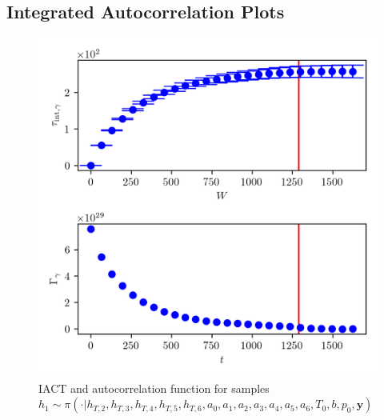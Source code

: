 \subsection{Integrated Autocorrelation Plots} 
\begin{figure}[ht!]
	\centering
	\includegraphics{UwerrTauIntTWalk0.png}
	\caption[IACT and autocorrelation function for $h_{T,1}$ samples.]{IACT and autocorrelation function for samples $h_1 \sim \pi( \cdot |h_{T,2},h_{T,3},h_{T,4},h_{T,5},h_{T,6},a_0,a_1,a_2,a_3,a_4,a_5,a_6,T_0,b,p_0, \bm{y})$}
	\label{fig:}
\end{figure}

